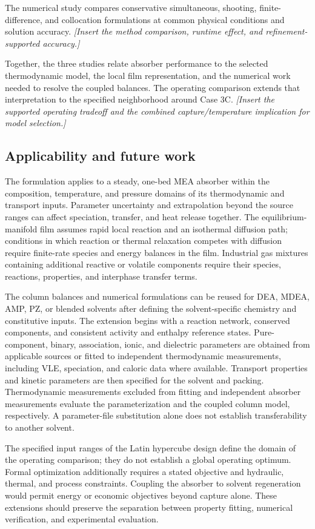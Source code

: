 The numerical study compares conservative simultaneous, shooting, finite-difference, and collocation formulations at common physical conditions and solution accuracy.
\textit{[Insert the method comparison, runtime effect, and refinement-supported accuracy.]}

Together, the three studies relate absorber performance to the selected thermodynamic model, the local film representation, and the numerical work needed to resolve the coupled balances.
The operating comparison extends that interpretation to the specified neighborhood around Case 3C.
\textit{[Insert the supported operating tradeoff and the combined capture/temperature implication for model selection.]}


\subsection{Applicability and future work}\label{subsec:applicability}
The formulation applies to a steady, one-bed MEA absorber within the composition, temperature, and pressure domains of its thermodynamic and transport inputs.
Parameter uncertainty and extrapolation beyond the source ranges can affect speciation, transfer, and heat release together.
The equilibrium-manifold film assumes rapid local reaction and an isothermal diffusion path; conditions in which reaction or thermal relaxation competes with diffusion require finite-rate species and energy balances in the film.
Industrial gas mixtures containing additional reactive or volatile components require their species, reactions, properties, and interphase transfer terms.

The column balances and numerical formulations can be reused for DEA, MDEA, AMP, PZ, or blended solvents after defining the solvent-specific chemistry and constitutive inputs.
The extension begins with a reaction network, conserved components, and consistent activity and enthalpy reference states.
Pure-component, binary, association, ionic, and dielectric parameters are obtained from applicable sources or fitted to independent thermodynamic measurements, including VLE, speciation, and caloric data where available.
Transport properties and kinetic parameters are then specified for the solvent and packing.
Thermodynamic measurements excluded from fitting and independent absorber measurements evaluate the parameterization and the coupled column model, respectively.
A parameter-file substitution alone does not establish transferability to another solvent.

The specified input ranges of the Latin hypercube design define the domain of the operating comparison; they do not establish a global operating optimum.
Formal optimization additionally requires a stated objective and hydraulic, thermal, and process constraints.
Coupling the absorber to solvent regeneration would permit energy or economic objectives beyond capture alone.
These extensions should preserve the separation between property fitting, numerical verification, and experimental evaluation.
